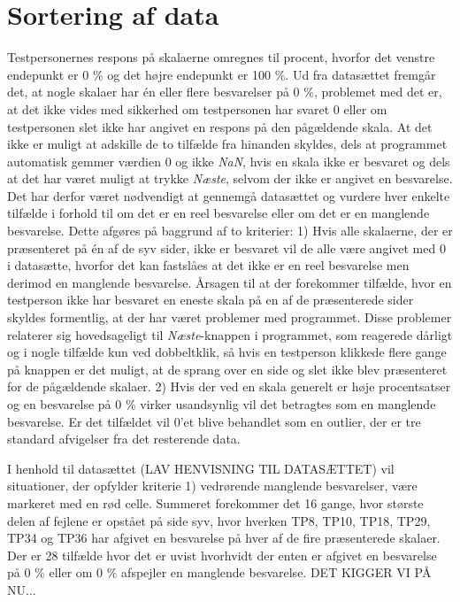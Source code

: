 \section{Sortering af data}
\label{TestAfSkalaSorteringAfData}
%
%
Testpersonernes respons på skalaerne omregnes til procent, hvorfor det venstre endepunkt er 0 \% og det højre endepunkt er 100 \%. Ud fra datasættet fremgår det, at nogle skalaer har én eller flere besvarelser på 0 \%, problemet med det er, at det ikke vides med sikkerhed om testpersonen har svaret 0 eller om testpersonen slet ikke har angivet en respons på den pågældende skala. At det ikke er muligt at adskille de to tilfælde fra hinanden skyldes, dels at programmet automatisk gemmer værdien 0 og ikke \textit{NaN}, hvis en skala ikke er besvaret og dels at det har været muligt at trykke \textit{Næste}, selvom der ikke er angivet en besvarelse. Det har derfor været nødvendigt at gennemgå datasættet og vurdere hver enkelte tilfælde i forhold til om det er en reel besvarelse eller om det er en manglende besvarelse. Dette afgøres på baggrund af to kriterier: 1) Hvis alle skalaerne, der er præsenteret på én af de syv sider, ikke er besvaret vil de alle være angivet med 0 i datasætte, hvorfor det kan fastslåes at det ikke er en reel besvarelse men derimod en manglende besvarelse. Årsagen til at der forekommer tilfælde, hvor en testperson ikke har besvaret en eneste skala på en af de præsenterede sider skyldes formentlig, at der har været problemer med programmet. Disse problemer relaterer sig hovedsageligt til \textit{Næste}-knappen i programmet, som reagerede dårligt og i nogle tilfælde kun ved dobbeltklik, så hvis en testperson klikkede flere gange på knappen er det muligt, at de sprang over en side og slet ikke blev præsenteret for de pågældende skalaer. 2) Hvis der ved en skala generelt er høje procentsatser og en besvarelse på 0 \% virker usandsynlig vil det betragtes som en manglende besvarelse. Er det tilfældet vil 0'et blive behandlet som en outlier, der er tre standard afvigelser fra det resterende data.

I henhold til datasættet (LAV HENVISNING TIL DATASÆTTET) vil situationer, der opfylder kriterie 1) vedrørende manglende besvarelser, være markeret med en rød celle. Summeret forekommer det 16 gange, hvor største delen af fejlene er opstået på side syv, hvor hverken TP8, TP10, TP18, TP29, TP34 og TP36 har afgivet en besvarelse på hver af de fire præsenterede skalaer. \blankline
%
Der er 28 tilfælde hvor det er uvist hvorhvidt der enten er afgivet en besvarelse på 0 \% eller om 0 \% afspejler en manglende besvarelse. DET KIGGER VI PÅ NU... 


